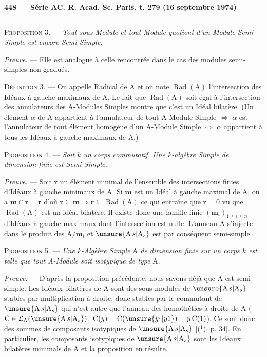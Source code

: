 \textbf{448 — Série A}\hfill\textbf{C. R. Acad. Sc. Paris, t. 279 (16 septembre 1974)}

\rule{\linewidth}{0.4pt}

\textsc{Proposition 3}. — \emph{Tout sous-Module et tout Module quotient d'un Module Semi-Simple
est encore Semi-Simple.}

\emph{Preuve}. — Elle est analogue à celle rencontrée dans le cas des modules semi-simples
non gradués.

\textsc{Définition 3}. — On appelle Radical de A et on note $\operatorname{Rad}(\mathrm A)$ l'intersection des Idéaux
à gauche maximaux de A. Le fait que $\operatorname{Rad}(\mathrm A)$ soit égal à l'intersection des annulateurs
des A-Modules Simples montre que c'est un Idéal bilatère. (Un élément $\alpha$ de A appartient
à l'annulateur de tout A-Module Simple $\Leftrightarrow$ $\alpha$ est l'annulateur de tout élément homogène
d'un A-Module Simple $\Leftrightarrow$ $\alpha$ appartient à tous les Idéaux à gauche maximaux de A.)

\textsc{Proposition 4}. — \emph{Soit $k$ un corps commutatif. Une $k$-algèbre Simple de dimension finie
est Semi-Simple.}

\emph{Preuve}. — Soit $\mathbf r$ un élément minimal de l'ensemble des intersections finies d'Idéaux à
gauche minimaux de A. Si $\mathbf m$ est un Idéal à gauche maximal de A, on a $\mathbf m\cap\mathbf r=\mathbf r$ d'où
$\mathbf r\subseteq\mathbf m\Rightarrow\mathbf r\subseteq\operatorname{Rad}(\mathrm A)$ ce qui entraîne que $\mathbf r=0$ vu que $\operatorname{Rad}(\mathrm A)$ est un idéal bilatère. Il
existe donc une famille finie $(\mathbf m_i)_{1\le i\le n}$ d'Idéaux à gauche maximaux dont l'intersection
est nulle. L'anneau A s'injecte dans le produit des $\mathrm A/\mathbf m_i$ et $\unsure{\mathrm A\,s|\mathrm A_s}$ est par conséquent semi-simple.

\textsc{Proposition 5}. — \emph{Une $k$-Algèbre Simple} A \emph{de dimension finie sur un corps $k$ est telle
que tout A-Module soit isotypique de type} A.

\emph{Preuve}. — D'après la proposition précédente, nous savons déjà que A est semi-simple.
Les Idéaux bilatères de A sont des sous-modules de $\unsure{\mathrm A\,s|\mathrm A_s}$ stables par multiplication à droite,
donc stables par le commutant de $\unsure{\mathrm A\,s|\mathrm A_s}$ qui n'est autre que l'anneau des homothéties à
droite de A ($\mathrm C\in\mathcal L_{\mathrm A}(\unsure{\mathrm A\,s|\mathrm A_s})$, $\mathrm C(y)=\mathrm C(\unsure{y_1|y1})=y\,\mathrm C(1)$). Ce sont donc des sommes de composants
isotypiques de $\unsure{\mathrm A\,s|\mathrm A_s}$ [(${}^1$), p. 34]. En particulier, les composants isotypiques de $\unsure{\mathrm A\,s|\mathrm A_s}$
sont les Idéaux bilatères minimals de A et la proposition en résulte.

